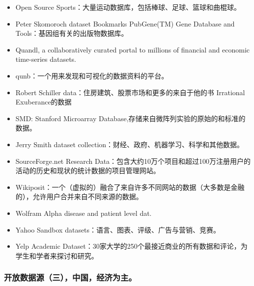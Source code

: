 \documentclass[letterpaper,10pt,english]{sphinxmanual}
\begin{document}
\begin{itemize}
\item {} 
Open Source Sports：大量运动数据库，包括棒球、足球、篮球和曲棍球。

\item {} 
Peter Skomoroch dataset Bookmarks PubGene(TM) Gene Database and Tools：基因组有关的出版物数据库。

\item {} 
Quandl, a collaboratively curated portal to millions of financial and economic time-series datasets.

\item {} 
qunb：一个用来发现和可视化的数据资料的平台。

\item {} 
Robert Schiller data：住房建筑、股票市场和更多的来自于他的书 Irrational Exuberance的数据

\item {} 
SMD: Stanford Microarray Database,存储来自微阵列实验的原始的和标准的数据。

\item {} 
Jerry Smith dataset collection：财经、政府、机器学习、科学和其他数据。

\item {} 
SourceForge.net Research Data：包含大约10万个项目和超过100万注册用户的活动的历史和现状的统计数据的项目管理网站。

\item {} 
Wikiposit：一个（虚拟的）融合了来自许多不同网站的数据（大多数是金融的），允许用户合并来自不同来源的数据。

\item {} 
Wolfram Alpha disease and patient level dat.

\item {} 
Yahoo Sandbox datasets：语言、图表、评级、广告与营销、竞赛。

\item {} 
Yelp Academic Dataset：30家大学的250个最接近商业的所有数据和评论，为学生和学者来探讨和研究。

\end{itemize}


\subsubsection{开放数据源（三），中国，经济为主。}
\label{opendatasource:}\label{opendatasource:id4}
\end{document}
